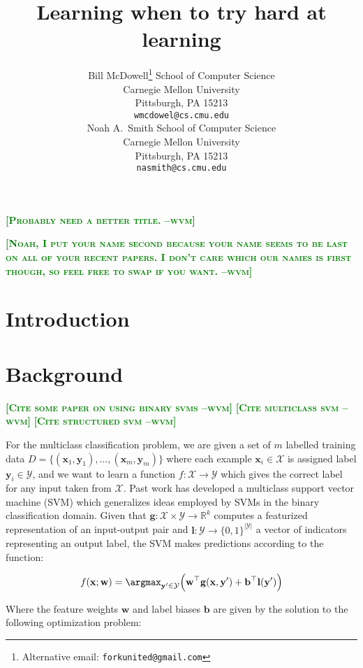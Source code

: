 \documentclass{article} %
\title{Learning when to try hard at learning}
\author{
Bill McDowell\thanks{Alternative email: \texttt{forkunited@gmail.com}}
School of Computer Science\\
Carnegie Mellon University\\
Pittsburgh, PA 15213 \\
\texttt{wmcdowel@cs.cmu.edu} \\
\And
Noah A.~Smith
School of Computer Science\\
Carnegie Mellon University\\
Pittsburgh, PA 15213 \\
\texttt{nasmith@cs.cmu.edu} \\
}
\newcommand{\bmcomment}[1]{\textcolor{green}{\textsc{\textbf{[#1 --wvm]}}}}
\begin{document}
\maketitle

\bmcomment{Probably need a better title.}

\bmcomment{Noah, I put your name second because your name seems 
to be last on all of your recent papers.  I don't care which our names is
first though, so feel free to swap if you want.}

\begin{abstract}
\end{abstract}

\section{Introduction}

\section{Background}

\bmcomment{Cite some paper on using binary svms}
\bmcomment{Cite multiclass svm}
\bmcomment{Cite structured svm}

For the multiclass classification problem, we are given a set of
$m$ labelled training data
$D=\{(\mathbf{x}_1,\mathbf{y}_1),...,(\mathbf{x}_m, \mathbf{y}_m)\}$ where each
example $\mathbf{x}_i\in \mathcal{X}$ is assigned label 
$\mathbf{y}_i\in\mathcal{Y}$, and we want to learn a function 
$f:\mathcal{X}\rightarrow\mathcal{Y}$ which gives the correct
label for any input taken from $\mathcal{X}$.  Past work has developed
a multiclass support vector machine (SVM) which generalizes ideas
employed by SVMs in the binary classification domain.  Given that
$\mathbf{g}:\mathcal{X}\times\mathcal{Y}\rightarrow \mathbb{R}^k$ 
computes a featurized representation of an input-output pair and
$\mathbf{l}:\mathcal{Y}\rightarrow\{0,1\}^{|\mathcal{Y}|}$ a 
vector of indicators representing an output label, the SVM makes 
predictions according to the function:

\begin{equation}
\label{prediction}
f(\mathbf{\mathbf{x};\mathbf{w}})=\argmax_{\mathbf{y}'\in\mathcal{Y}}\Big( \mathbf{w}^\top \mathbf{g}(\mathbf{x},\mathbf{y}')+\mathbf{b}^\top\mathbf{l}(\mathbf{y}') \Big)
\end{equation}

Where the feature weights $\mathbf{w}$ and label biases $\mathbf{b}$
are given by the solution to the following optimization problem:
\end{document}
